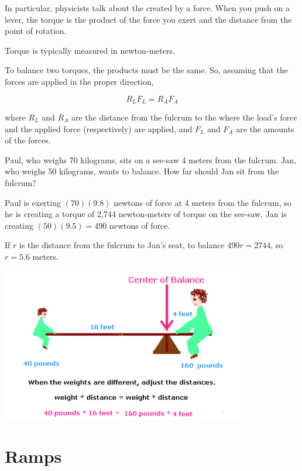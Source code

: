 In particular, physicists talk about the  created by a
force. When you push on a lever, the torque is the product of the
force you exert and the distance from the point of rotation.

Torque is typically measured in newton-meters.

To balance two torques, the products must be the same. So, assuming
that the forces are applied in the proper direction,

$$R_L F_L = R_A F_A$$

where $R_L$ and $R_A$ are the distance from the fulcrum to the where
the load's force and the applied force (respectively) are applied, and
$F_L$ and $F_A$ are the amounts of the forces.

\begin{Exercise}[title={Lever}, label=lever]
  
Paul, who weighs 70 kilograms, sits on a see-saw 4 meters from the
fulcrum.  Jan, who weighs 50 kilograms, wants to balance. How far
should Jan sit from the fulcrum?

\end{Exercise}
\begin{Answer}[ref=lever]
  Paul is exerting $(70)(9.8)$ newtons of force at 4 meters from the
  fulcrum, so he is creating a torque of 2,744 newton-meters of torque
  on the see-saw.  Jan is creating $(50)(9.5) = 490$ newtons of
  force.

  If $r$ is the distance from the fulcrum to Jan's seat, to balance
  $490 r = 2744$, so $r = 5.6$ meters.
\end{Answer}

\includegraphics[width=0.8\textwidth]{WD=WD.png}

\section{Ramps}

